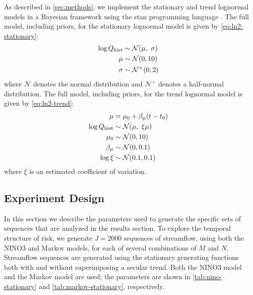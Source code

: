 \documentclass[
  draft,
  linenumbers
]{agujournal2018}
\newcommand{\normal}{\mathcal{N}}
\begin{document}
As described in \cref{sec:methods}, we implement the stationary and trend lognormal models in a Bayesian framework using the stan programming language \citep{Carpenter:2017ke}.
The full model, including priors, for the stationary lognormal model is given by \cref{eq:ln2-stationary}:
\begin{align}\label{eq:ln2-stationary}
  \begin{split}
    \log Q_\text{hist} & \sim \normal \qty(\mu, \ \sigma) \\
    \mu &\sim \normal \qty(0, 10) \\
    \sigma &\sim \normal^+ \qty(0, 2)
  \end{split}
\end{align}
where $\normal$ denotes the normal distribution and $\normal^+$ denotes a half-normal distribution.
The full model, including priors, for the trend lognormal model is given by \cref{eq:ln2-trend}:
\begin{align}\label{eq:ln2-trend}
  \begin{split}
    \mu &= \mu_0 + \beta_\mu \qty(t - t_0) \\
  \log Q_\text{hist} & \sim \normal \qty(\mu, \ \xi \mu) \\
  \mu_0 & \sim \normal \qty(0, 10) \\
  \beta_\mu & \sim \normal \qty(0, 0.1) \\
  \log \xi & \sim \normal \qty(0.1, 0.1)
  \end{split}
\end{align}
where $\xi$ is an estimated coefficient of variation.

\subsection{Experiment Design}\label{sec:methods-experiments}

In this section we describe the parameters used to generate the specific sets of sequences that are analyzed in the results section.
To explore the temporal structure of risk, we generate $J=2000$ sequences of streamflow, using both the NINO3 and Markov models, for each of several combinations of $M$ and $N$.
Streamflow sequences are generated using the stationary generating functions both with and without superimposing a secular trend.
Both the NINO3 model and the Markov model are used; the parameters are shown in \cref{tab:nino-stationary} and \cref{tab:markov-stationary}, respectively.
\end{document}
